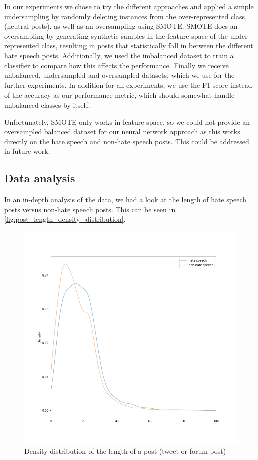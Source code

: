 In our experiments we chose to try the different approaches and applied a simple undersampling by randomly deleting instances from the over-represented class (neutral posts), as well as an oversampling using SMOTE. SMOTE does an oversampling by generating synthetic samples in the feature-space of the under-represented class, resulting in posts that statistically fall in between the different hate speech posts. Additionally, we used the imbalanced dataset to train a classifier to compare how this affects the performance.
Finally we receive unbalanced, undersampled and oversampled datasets, which we use for the further experiments. In addition for all experiments, we use the F1-score instead of the accuracy as our performance metric, which should somewhat handle unbalanced classes by itself.

Unfortunately, SMOTE only works in feature space, so we could not provide an oversampled balanced dataset for our neural network approach as this works directly on the hate speech and non-hate speech posts. This could be addressed in future work.

\subsection{Data analysis} \label{sec:data_analysis}


In an in-depth analysis of the data, we had a look at the length of hate speech posts versus non-hate speech posts. This can be seen in \autoref{fig:post_length_density_distribution}.

\begin{figure}[ht]
    \centering
    \includegraphics[width=0.8\linewidth]{figures/post_length_density_distribution.png}
    \caption{Density distribution of the length of a post (tweet or forum post)}
    \label{fig:post_length_density_distribution}
\end{figure}

